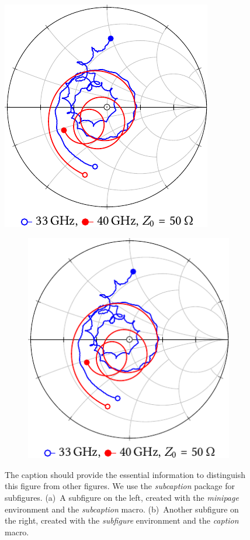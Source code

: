 \begin{figure}[tp]
    \centering
    \begin{minipage}[b]{.5\linewidth}
        \centering
        \includegraphics{./Figures/Fig_4__measure_smithchart/Fig_4__measure_smithchart.pdf}
        \subcaption{\mbox{}}\label{fig:1a}%
    \end{minipage}%
    \begin{subfigure}[b]{.5\linewidth}
        \centering
        \includegraphics{./Figures/Fig_4__measure_smithchart/Fig_4__measure_smithchart.pdf}
        \caption{}\label{fig:1b}
    \end{subfigure}
    \caption{The caption should provide the essential information to distinguish this figure from other figures. 
        We use the \emph{subcaption} package for subfigures. 
        (a)~A subfigure on the left, created with the \emph{minipage} environment and the \emph{subcaption} macro. 
        (b)~Another subfigure on the right, created with  the \emph{subfigure} environment and the \emph{caption} macro. }
    \label{fig:samplefigure4}
\end{figure}		

